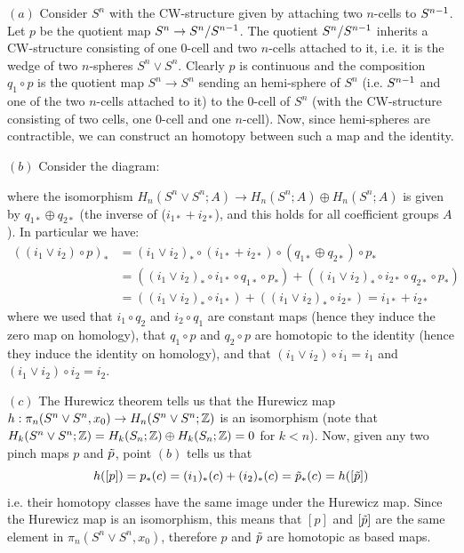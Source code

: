 \documentclass[a4paper,11pt,english]{article}
\begin{document}
\begin{exercise}[2]

$(a)$ Consider $S^n$ with the CW-structure given by attaching two $n$-cells to $S^{n-1}$. Let $p$ be the quotient map $S^n\to S^n/S^{n-1}$. The quotient $S^n/S^{n-1}$ inherits a CW-structure consisting of one $0$-cell and two $n$-cells attached to it, i.e. it is the wedge of two $n$-spheres $S^n\vee S^n$. Clearly $p$ is continuous and the composition $q_1\circ p$ is the quotient map $S^n\to S^n$ sending an hemi-sphere of $S^n$ (i.e. $S^{n-1}$ and one of the two $n$-cells attached to it) to the $0$-cell of $S^n$ (with the CW-structure consisting of two cells, one $0$-cell and one $n$-cell). Now, since hemi-spheres are contractible, we can construct an homotopy between such a map and the identity. \bigskip

$(b)$ Consider the diagram:
\begin{center}
\end{center}
where the isomorphism $H_n(S^n\vee S^n;A)\to H_n(S^n;A)\oplus H_n(S^n;A)$ is given by $q_{1*}\oplus q_{2*}$ (the inverse of ($i_{1*}+i_{2*}$), and this holds for all coefficient groups $A$). In particular we have:
\begin{align*}
    ((i_1\vee i_2)\circ p)_* &= (i_1\vee i_2)_*\circ (i_{1*}+i_{2*}) \circ (q_{1*}\oplus q_{2*}) \circ p_* \\
    &= ((i_1\vee i_2)_*\circ i_{1*} \circ q_{1*} \circ p_*) + ((i_1\vee i_2)_*\circ i_{2*} \circ q_{2*} \circ p_*) \\
    &= ((i_1\vee i_2)_*\circ i_{1*}) + ((i_1\vee i_2)_*\circ i_{2*}) = i_{1*} + i_{2*}
\end{align*}
where we used that $i_1\circ q_2$ and $i_2\circ q_1$ are constant maps (hence they induce the zero map on homology), that $q_1\circ p$ and $q_2\circ p$ are homotopic to the identity (hence they induce the identity on homology), and that $(i_1\vee i_2)\circ i_1=i_1$ and $(i_1\vee i_2)\circ i_2=i_2$. \bigskip

$(c)$ The Hurewicz theorem tells us that the Hurewicz map $h:\pi_n(S^n\vee S^n,x_0)\to H_n(S^n\vee S^n;\mathbb{Z})$ is an isomorphism (note that $H_k(S^n\vee S^n;\mathbb{Z})=H_k(S_n;\mathbb{Z})\oplus H_k(S_n;\mathbb{Z})=0$ for $k<n$). Now, given any two pinch maps $p$ and $\tilde{p}$, point $(b)$ tells us that \[h([p])=p_*(c)=(i_1)_*(c)+(i_2)_*(c)=\tilde{p}_*(c)=h([\tilde{p}])\]
i.e. their homotopy classes have the same image under the Hurewicz map. Since the Hurewicz map is an isomorphism, this means that $[p]$ and $[\tilde{p}]$ are the same element in $\pi_n(S^n\vee S^n,x_0)$, therefore $p$ and $\tilde{p}$ are homotopic as based maps.

\end{exercise}
\end{document}
